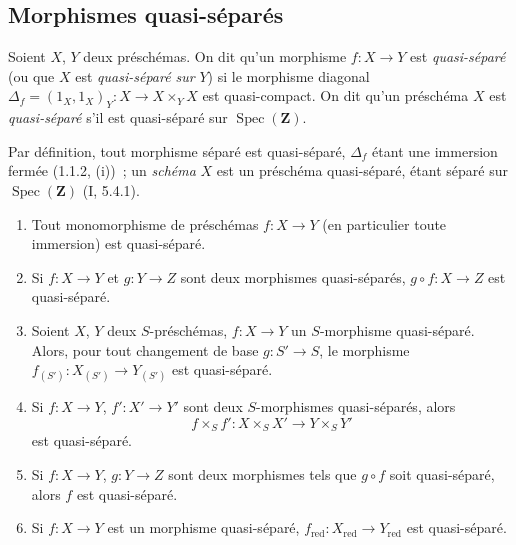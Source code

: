 \subsection{Morphismes quasi-séparés}
\label{subsection:IV.1.2-fr}

\begin{definition}[1.2.1]
\label{IV.1.2.1-fr}
Soient $X$, $Y$ deux préschémas. On dit qu'un morphisme $f:X\to Y$ est
\emph{quasi-séparé} (ou que $X$ est \emph{quasi-séparé sur} $Y$) si le
morphisme diagonal
$\Delta_f=(1_X,1_X)_Y:X\to X\times_Y X$ est quasi-compact. On dit qu'un
préschéma $X$ est \emph{quasi-séparé} s'il est quasi-séparé sur
$\operatorname{Spec}(\mathbf Z)$.
\end{definition}

Par définition, tout morphisme séparé est quasi-séparé, $\Delta_f$ étant une
immersion fermée (1.1.2, (i))~; un \emph{schéma} $X$ est un préschéma
quasi-séparé, étant séparé sur $\operatorname{Spec}(\mathbf Z)$ (I, 5.4.1).

\begin{proposition}[1.2.2]
\label{IV.1.2.2-fr}
\begin{enumerate}
  \item[(i)] Tout monomorphisme de préschémas $f:X\to Y$ (en particulier toute
  immersion) est quasi-séparé.
  \item[(ii)] Si $f:X\to Y$ et $g:Y\to Z$ sont deux morphismes quasi-séparés,
  $g\circ f:X\to Z$ est quasi-séparé.
  \item[(iii)] Soient $X$, $Y$ deux $S$-préschémas, $f:X\to Y$ un $S$-morphisme
  quasi-séparé. Alors, pour tout changement de base $g:S'\to S$, le morphisme
  $f_{(S')}:X_{(S')}\to Y_{(S')}$ est quasi-séparé.
  \item[(iv)] Si $f:X\to Y$, $f':X'\to Y'$ sont deux $S$-morphismes quasi-séparés,
  alors
  \[
    f\times_S f':X\times_S X'\to Y\times_S Y'
  \]
  est quasi-séparé.
  \item[(v)] Si $f:X\to Y$, $g:Y\to Z$ sont deux morphismes tels que $g\circ f$
  soit quasi-séparé, alors $f$ est quasi-séparé.
  \item[(vi)] Si $f:X\to Y$ est un morphisme quasi-séparé,
  $f_{\mathrm{red}}:X_{\mathrm{red}}\to Y_{\mathrm{red}}$ est quasi-séparé.
\end{enumerate}
\end{proposition}

